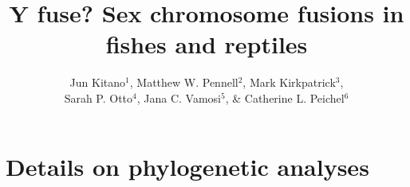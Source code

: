 \documentclass[12pt,twoside]{article}
\title{Y fuse? Sex chromosome fusions in fishes and reptiles}
\author{Jun Kitano$^1$, Matthew W. Pennell$^2$, Mark Kirkpatrick$^3$,\\ Sarah P. Otto$^4$, Jana C. Vamosi$^5$, \& Catherine L. Peichel$^6$}
\date{}
\begin{document}
\maketitle

\section{Details on phylogenetic analyses}
\end{document}
